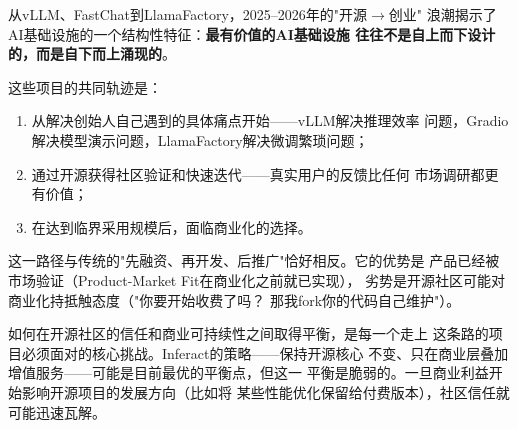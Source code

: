 \begin{corebox}["开源$\to$公司"浪潮的深层意义]
从vLLM、FastChat到LlamaFactory，2025--2026年的"开源$\to$创业"
浪潮揭示了AI基础设施的一个结构性特征：\textbf{最有价值的AI基础设施
往往不是自上而下设计的，而是自下而上涌现的}。

这些项目的共同轨迹是：
\begin{enumerate}
  \item 从解决创始人自己遇到的具体痛点开始——vLLM解决推理效率
    问题，Gradio解决模型演示问题，LlamaFactory解决微调繁琐问题；
  \item 通过开源获得社区验证和快速迭代——真实用户的反馈比任何
    市场调研都更有价值；
  \item 在达到临界采用规模后，面临商业化的选择。
\end{enumerate}

这一路径与传统的"先融资、再开发、后推广"恰好相反。它的优势是
产品已经被市场验证（Product-Market Fit在商业化之前就已实现），
劣势是开源社区可能对商业化持抵触态度（"你要开始收费了吗？
那我fork你的代码自己维护"）。

如何在开源社区的信任和商业可持续性之间取得平衡，是每一个走上
这条路的项目必须面对的核心挑战。Inferact的策略——保持开源核心
不变、只在商业层叠加增值服务——可能是目前最优的平衡点，但这一
平衡是脆弱的。一旦商业利益开始影响开源项目的发展方向（比如将
某些性能优化保留给付费版本），社区信任就可能迅速瓦解。
\end{corebox}



\bigskip

